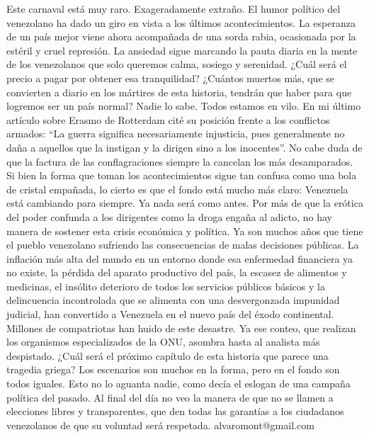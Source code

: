 \documentclass{article}%
\begin{document}
\newline%
%
Este carnaval está muy raro. Exageradamente extraño. El humor político del venezolano ha dado un giro en vista a los últimos acontecimientos. La esperanza de un país mejor viene ahora acompañada de una sorda rabia, ocasionada por la estéril y cruel represión. La ansiedad sigue marcando la pauta diaria en la mente de los venezolanos que solo queremos calma, sosiego y serenidad. ¿Cuál será el precio a pagar por obtener esa tranquilidad? ¿Cuántos muertos más, que se convierten a diario en los mártires de esta historia, tendrán que haber para que logremos ser un país normal? Nadie lo sabe. Todos estamos en vilo. En mi último artículo sobre Erasmo de Rotterdam cité su posición frente a los conflictos armados: “La guerra significa necesariamente injusticia, pues generalmente no daña a aquellos que la instigan y la dirigen sino a los inocentes”. No cabe duda de que la factura de las conflagraciones siempre la cancelan los más desamparados.%
\newline%
%
Si bien la forma que toman los acontecimientos sigue tan confusa como una bola de cristal empañada, lo cierto es que el fondo está mucho más claro: Venezuela está cambiando para siempre. Ya nada será como antes. Por más de que la erótica del poder confunda a los dirigentes como la droga engaña al adicto, no hay manera de sostener esta crisis económica y política. Ya son muchos años que tiene el pueblo venezolano sufriendo las consecuencias de malas decisiones públicas. La inflación más alta del mundo en un entorno donde esa enfermedad financiera ya no existe, la pérdida del aparato productivo del país, la escasez de alimentos y medicinas, el insólito deterioro de todos los servicios públicos básicos y la delincuencia incontrolada que se alimenta con una desvergonzada impunidad judicial, han convertido a Venezuela en el nuevo país del éxodo continental. Millones de compatriotas han huido de este desastre. Ya ese conteo, que realizan los organismos especializados de la ONU, asombra hasta al analista más despistado.%
\newline%
%
¿Cuál será el próximo capítulo de esta historia que parece una tragedia griega? Los escenarios son muchos en la forma, pero en el fondo son todos iguales. Esto no lo aguanta nadie, como decía el eslogan de una campaña política del pasado. Al final del día no veo la manera de que no se llamen a elecciones libres y transparentes, que den todas las garantías a los ciudadanos venezolanos de que su voluntad será respetada.%
\newline%
%
alvaromont@gmail.com%
\newline%
%
\end{document}
